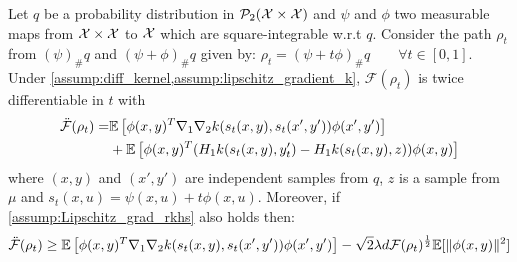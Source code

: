 \begin{lemma}\label{lem:second_derivative_augmented_mmd}
Let $q$ be a probability distribution in $\mathcal{P}_2({{\mathcal X}} \times {{\mathcal X}})$ and $\psi$ and $\phi$ two measurable maps from  ${{\mathcal X}} \times{{\mathcal X}} $ to ${{\mathcal X}}$  which are square-integrable w.r.t $q$. Consider the path $\rho_t$ from  $(\psi)_{\#}q$ and $(\psi+\phi)_{\#}q$ given by: $\rho_t=  (\psi+t\phi)_{\#}q \qquad \forall t\in [0,1]$. Under \cref{assump:diff_kernel,assump:lipschitz_gradient_k}, $\mathcal{F}(\rho_t)$ is twice differentiable in $t$ with
	\begin{align*}
		\ddot{{{\mathcal F}}}(\rho_t)=&\mathbb{E}\left[\phi(x,y)^T\nabla_1 \nabla_2 k(s_t(x,y),s_t(x',y')) \phi(x',y')\right] \\
		&+ \mathbb{E}\left[\phi(x,y)^T (H_1k(s_t(x,y),y_t')-H_1k(s_t(x,y),z)) \phi(x,y)\right]
	\end{align*}
where $(x,y)$ and $(x',y')$ are independent samples from $q$, $z$ is a sample from $\mu$ and  $s_t(x,u)= \psi(x,u)+t\phi(x,u)$.
Moreover, if \cref{assump:Lipschitz_grad_rkhs} also holds then:
\begin{align*}
		\ddot{{{\mathcal F}}}(\rho_t) \geq \mathbb{E}\left[\phi(x,y)^T\nabla_1 \nabla_2 k(s_t(x,y),s_t(x',y')) \phi(x',y')\right] - \sqrt{2}\lambda d {{\mathcal F}}(\rho_t)^{\frac{1}{2}}\mathbb{E}[\Vert \phi(x,y) \Vert^2]  
\end{align*}
\end{lemma}
